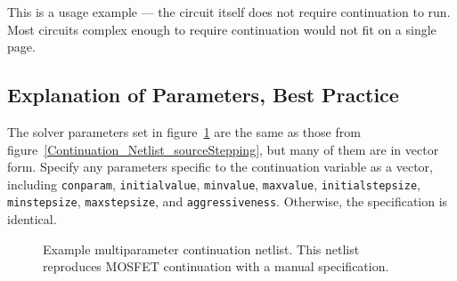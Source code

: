 
This is a usage example --- the circuit itself does not require continuation to run. Most circuits complex enough to require continuation would not fit on a single page.  

\subsection{Explanation of Parameters, Best Practice}

The solver parameters set in figure~\ref{Continuation_Netlist_multiParam} are 
the same as those from figure~\ref{Continuation_Netlist_sourceStepping}, but many of them
are in vector form.  Specify any parameters specific to the 
continuation variable as a vector, including \texttt{conparam}, \texttt{initialvalue},
 \texttt{minvalue}, \texttt{maxvalue}, \texttt{initialstepsize},
 \texttt{minstepsize}, \texttt{maxstepsize}, and \texttt{aggressiveness}.
Otherwise, the specification is identical.

\begin{figure}[htbp]
\begin{centering}
\caption [Example multiparameter continuation netlist]{Example multiparameter continuation netlist. 
This netlist reproduces MOSFET continuation with a manual specification. \label{Continuation_Netlist_multiParam}}


\end{centering}
\end{figure}




